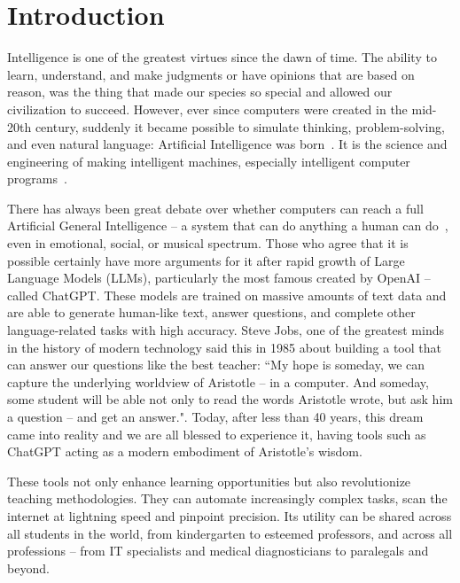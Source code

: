 

\chapter{Introduction}
\thispagestyle{empty}

Intelligence is one of the greatest virtues since the dawn of time. The ability to learn, understand, and make judgments or have opinions that are based on reason, was the thing that made our species so special and allowed our civilization to succeed. However, ever since computers were created in the mid-20th century, suddenly it became possible to simulate thinking, problem-solving, and even natural language: Artificial Intelligence was born~\cite{pfeifer2001understanding}. It is the science and engineering of making intelligent machines, especially intelligent computer programs~\cite{mccarthy2007artificial}.

\vspace{3mm} 

There has always been great debate over whether computers can reach a full Artificial General Intelligence -- a system that can do anything a human can do~\cite{Hutter:07aixigentle}, even in emotional, social, or musical spectrum. Those who agree that it is possible certainly have more arguments for it after rapid growth of Large Language Models (LLMs), particularly the most famous created by OpenAI -- called ChatGPT. These models are trained on massive amounts of text data and are able to generate human-like text, answer questions, and complete other language-related tasks with high accuracy. Steve Jobs, one of the greatest minds in the history of modern technology said this in 1985 about building a tool that can answer our questions like the best teacher: “My hope is someday, we can capture the underlying worldview of Aristotle -- in a computer. And someday, some student will be able not only to read the words Aristotle wrote, but ask him a question -- and get an answer.". Today, after less than 40 years, this dream came into reality and we are all blessed to experience it, having tools such as ChatGPT acting as a modern embodiment of Aristotle's wisdom.

\vspace{3mm} 

These tools not only enhance learning opportunities but also revolutionize teaching methodologies. They can automate increasingly complex tasks, scan the internet at lightning speed and pinpoint precision. Its utility can be shared across all students in the world, from kindergarten to esteemed professors, and across all professions -- from IT specialists and medical diagnosticians to paralegals and beyond.

